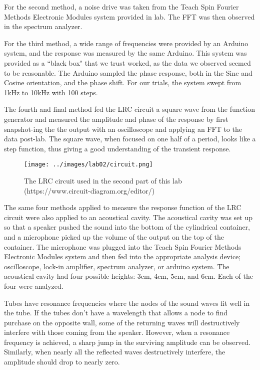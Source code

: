 \documentclass[12pt]{article}
\begin{document}
For the second method, a noise drive was taken from the Teach Spin Fourier Methods Electronic Modules system provided in lab. The FFT was then observed in the spectrum analyzer. 

For the third method, a wide range of frequencies were provided by an Arduino system, and the response was measured by the same Arduino. This system was provided as a ``black box" that we trust worked, as the data we observed seemed to be reasonable. The Arduino sampled the phase response, both in the Sine and Cosine orientation, and the phase shift. For our trials, the system swept from 1kHz to 10kHz with 100 steps. 

The fourth and final method fed the LRC circuit a square wave from the function generator and measured the amplitude and phase of the response by first snapshot-ing the the output with an oscilloscope and applying an FFT to the data post-lab. The square wave, when focused on one half of a period, looks like a step function, thus giving a good understanding of the transient response. 

\begin{figure}[!ht]
\centering
\texttt{[image: ../images/lab02/circuit.png]}
\caption{The LRC circuit used in the second part of this lab (https://www.circuit-diagram.org/editor/)}
\label{fig:circuit}
\end{figure}

The same four methods applied to measure the response function of the LRC circuit were also applied to an acoustical cavity. The acoustical cavity was set up so that a speaker pushed the sound into the bottom of the cylindrical container, and a microphone picked up the volume of the output on the top of the container. The microphone was plugged into the Teach Spin Fourier Methods Electronic Modules system and then fed into the appropriate analysis device; oscilloscope, lock-in amplifier, spectrum analyzer, or arduino system. The acoustical cavity had four possible heights: 3cm, 4cm, 5cm, and 6cm. Each of the four were analyzed. 

Tubes have resonance frequencies where the nodes of the sound waves fit well in the tube. If the tubes don't have a wavelength that allows a node to find purchase on the opposite wall, some of the returning waves will destructively interfere with those coming from the speaker. However, when a resonance frequency is achieved, a sharp jump in the surviving amplitude can be observed. Similarly, when nearly all the reflected waves destructively interfere, the amplitude should drop to nearly zero. 
\end{document}
